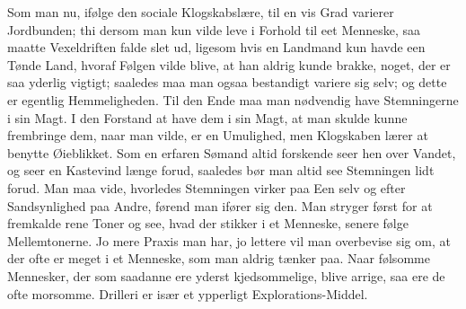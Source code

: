 \documentclass[12pt,a4paper]{article}
\begin{document}
Som man nu, ifølge den sociale Klogskabslære, til en vis Grad varierer Jordbunden; thi dersom man kun vilde leve i Forhold til eet Menneske, saa maatte Vexeldriften falde slet ud, ligesom hvis en Landmand kun havde een Tønde Land, hvoraf Følgen vilde blive, at han aldrig kunde brakke, noget, der er saa yderlig vigtigt; saaledes maa man ogsaa bestandigt variere sig selv; og dette er egentlig Hemmeligheden. Til den Ende maa man nødvendig have Stemningerne i sin Magt. I den Forstand at have dem i sin Magt, at man skulde kunne frembringe dem, naar man vilde, er en Umulighed, men Klogskaben lærer at benytte Øieblikket. Som en erfaren Sømand altid forskende seer hen over Vandet, og seer en Kastevind længe forud, saaledes bør man altid see Stemningen lidt forud. Man maa vide, hvorledes Stemningen virker paa Een selv og efter Sandsynlighed paa Andre, førend man ifører sig den. Man stryger først for at fremkalde rene Toner og see, hvad der stikker i et Menneske, senere følge Mellemtonerne. Jo mere Praxis man har, jo lettere vil man overbevise sig om, at der ofte er meget i et Menneske, som man aldrig tænker paa. Naar følsomme Mennesker, der som saadanne ere yderst kjedsommelige, blive arrige, saa ere de ofte morsomme. Drilleri er især et ypperligt Explorations-Middel.
\end{document}
